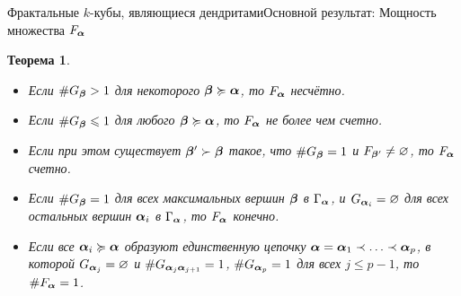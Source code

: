 \documentclass[aspectratio=1610, 10pt, notheorems]{beamer}
\newtheorem{theorem}     {Теорема}
\newtheorem{lemma}       {Лемма}
\newtheorem{definition}  {Определение}
\begin{document}
%
%




\begin{frame}{Фрактальные $k$-кубы, являющиеся дендритами}{Основной результат: Мощность множества $F_{\bm{\alpha}}$}
\begin{theorem}
\begin{itemize} %
\item[(1)] Если $\#G_{\bm{\beta}}>1$ для некоторого ${\bm{\beta}}\succcurlyeq{\bm{\alpha}}$, то  $F_{\bm{\alpha}}$ несчётно.

\item[(2a)] Если  $\#G_{\bm{\beta}}\leqslant1$ для любого ${\bm{\beta}}\succcurlyeq{\bm{\alpha}}$, то  $F_{\bm{\alpha}}$ не более чем счетно.

\item[(2b)] Если при этом существует ${\bm{\beta}}'\succ{\bm{\beta}}$ такое, что $\#G_{\bm{\beta}}=1$ и $F_{{\bm{\beta}}'}\neq\varnothing$, то $F_{\bm{\alpha}}$ счетно.

\item[(3)] Если  $\#G_{\bm{\beta}}=1$ для всех максимальных вершин ${\bm{\beta}}$ в $\Gamma_{\bm{\alpha}}$, и $G_{{\bm{\alpha}}_i}=\varnothing$ для всех остальных вершин ${\bm{\alpha}}_i$ в $\Gamma_{\bm{\alpha}}$, то $F_{\bm{\alpha}}$ конечно.

\item[(4)] Если все ${\bm{\alpha}}_i\succcurlyeq{\bm{\alpha}}$ образуют единственную цепочку ${\bm{\alpha}}={\bm{\alpha}}_1\prec\ldots\prec{\bm{\alpha}}_p$, в которой $G_{{\bm{\alpha}}_j}=\varnothing$ и $\# G_{{\bm{\alpha}}_j{\bm{\alpha}}_{j+1}}=1$, $\#G_{{\bm{\alpha}}_p}=1$ для всех $j\le p-1$, то $\#F_{\bm{\alpha}}=1$.
\end{itemize}
\end{theorem}
\end{frame}
\end{document}
